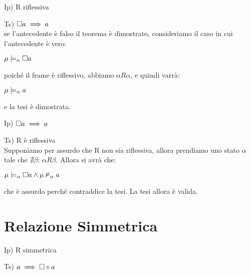 Ip) R riflessiva

Ts) $\square a\implies a$\\


se l'antecedente è falso il teorema è dimostrato, consideriamo il
caso in cui l'antecedente è vero:

$\mu\models_{\alpha}\square a$

poiché il frame è riflessivo, abbiamo $\alpha R\alpha$, e quindi
varrà:

$\mu\models_{\alpha}a$

e la tesi è dimostrata.

\begin{center} 
 \end{center}

Ip) $\square a\implies a$

Ts) R è riflessiva\\


Supponiamo per assurdo che R non sia riflessiva, allora prendiamo
uno stato $\alpha$ tale che $\nexists\beta:\,\alpha R\beta$. Allora
si avrà che:

$\mu\models_{\alpha}\square a\wedge\mu\nvDash_{\alpha}a$

che è assurdo perché contraddice la tesi. La tesi allora è valida.

\begin{center} 
\end{center}


\section{Relazione Simmetrica}

Ip) R simmetrica

Ts) $a\implies\square\diamond a$\\


